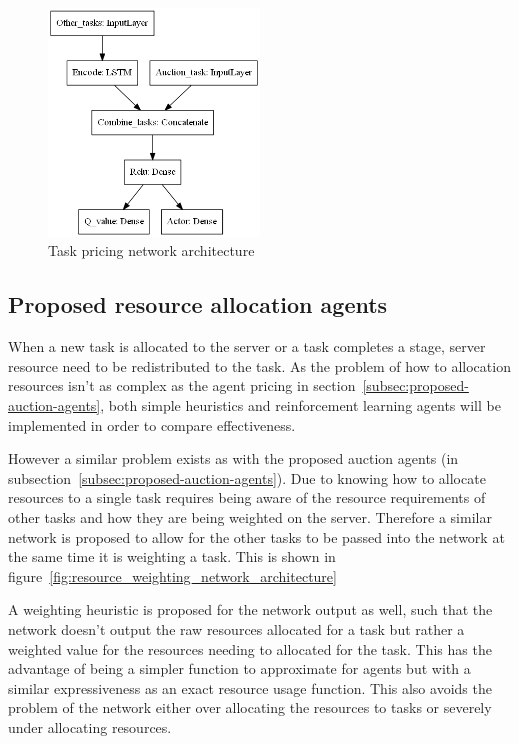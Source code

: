 \begin{figure}
    \centering
    \includegraphics[width=0.5\textwidth]{figures/2_solution_figs/task_pricing_network_architecture.png}
    \caption{Task pricing network architecture}
    \label{fig:task_pricing_network_architecture}
\end{figure}

\subsection{Proposed resource allocation agents}\label{subsec:proposed-resource-allocation-agents}
When a new task is allocated to the server or a task completes a stage, server resource need to be redistributed
to the task. As the problem of how to allocation resources isn't as complex as the agent pricing in
section~\ref{subsec:proposed-auction-agents}, both simple heuristics and reinforcement learning agents will be
implemented in order to compare effectiveness.

However a similar problem exists as with the proposed auction agents (in subsection~\ref{subsec:proposed-auction-agents}).
Due to knowing how to allocate resources to a single task requires being aware of the resource requirements of other
tasks and how they are being weighted on the server. Therefore a similar network is proposed to allow for the other tasks
to be passed into the network at the same time it is weighting a task. This is shown in
figure~\ref{fig:resource_weighting_network_architecture}

A weighting heuristic is proposed for the network output as well, such that the network doesn't output the raw
resources allocated for a task but rather a weighted value for the resources needing to allocated for the task.
This has the advantage of being a simpler function to approximate for agents but with a similar expressiveness as an
exact resource usage function. This also avoids the problem of the network either over allocating the resources to tasks
or severely under allocating resources.

